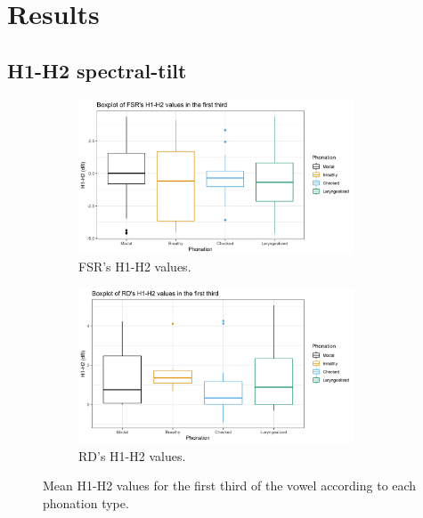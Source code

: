 \documentclass[12pt, letterpaper]{article}
\begin{document}
\section{Results} \label{sec:Results}

\subsection{H1-H2 spectral-tilt} \label{sec:H1H2}


\begin{figure}[!ht]
	\centering
	\begin{subfigure}{.5\textwidth}
		\centering
		\includegraphics[width=0.9\textwidth]{../mean_FSR_h1h2_1st.png}
		\caption{FSR's H1-H2 values.}
		\label{fig:FSRh1h2first} 
	\end{subfigure}%
	\begin{subfigure}{.5\textwidth}
		\centering
		\includegraphics[width=0.9\textwidth]{../mean_RD_h1h2_1st.png}
		\caption{RD's H1-H2 values.}
		\label{fig:RDh1h2first} 
	\end{subfigure}
	\caption{Mean H1-H2 values for the first third of the vowel according to each phonation type. }
	\label{fig:h1h2first}
\end{figure}
\end{document}
